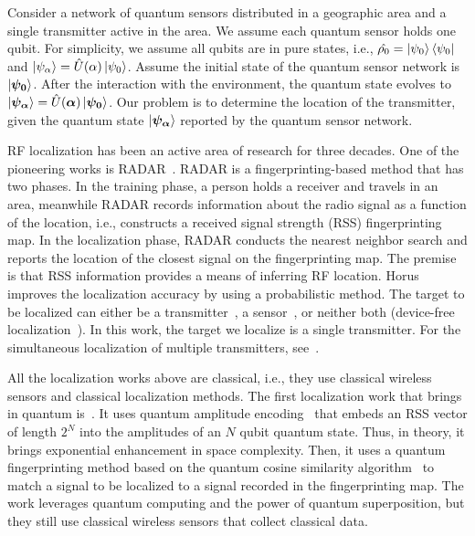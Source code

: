 Consider a network of quantum sensors distributed in a geographic area and a single transmitter active in the area.
We assume each quantum sensor holds one qubit. 
For simplicity, we assume all qubits are in pure states, i.e., $\hat{\rho_0} = \ket{\psi_0} \bra{\psi_0}$ and $\ket{\psi_{\alpha}} = \hat{U}(\alpha) \ket{\psi_0}$.
Assume the initial state of the quantum sensor network is 
$\ket{\boldsymbol{\psi_{0}}}$. 
After the interaction with the environment, the quantum state evolves to $\ket{\boldsymbol{\psi_{\alpha}}} = \hat{U}(\boldsymbol{\alpha}) \ket{\boldsymbol{\psi_{0}}}$.
Our problem is to determine the location of the transmitter, given the quantum state $\ket{\boldsymbol{\psi_{\alpha}}}$ reported by the quantum sensor network.


RF localization has been an active area of research for three decades.
One of the pioneering works is RADAR~\cite{infocom00-radar}.
RADAR is a fingerprinting-based method that has two phases.
In the training phase, a person holds a receiver and travels in an area, meanwhile RADAR records information about the radio signal as a function of the location, i.e., constructs a received signal strength (RSS) fingerprinting map.
In the localization phase, RADAR conducts the nearest neighbor search and reports the location of the closest signal on the fingerprinting map.
The premise is that RSS information provides a means of inferring RF location.
Horus~\cite{mobisys05-horus} improves the localization accuracy by using a probabilistic method.
The target to be localized can either be a transmitter~\cite{tx-localization}, a sensor~\cite{infocom00-radar}, or neither both (device-free localization~\cite{devicefree-loc}).
In this work, the target we localize is a single transmitter.
For the simultaneous localization of multiple transmitters, see~\cite{pmc22-deepmtlpro}.

All the localization works above are classical, i.e., they use classical wireless sensors and classical localization methods.
The first localization work that brings in quantum is~\cite{lcn22-qloc}.
It uses quantum amplitude encoding~\cite{slqc} that embeds an RSS vector of length $2^N$ into the amplitudes of an $N$ qubit quantum state. 
Thus, in theory, it brings exponential enhancement in space complexity.
Then, it uses a quantum fingerprinting method based on the quantum cosine similarity algorithm~\cite{PhysRevLett.quantumfingerprint} to match a signal to be localized to a signal recorded in the fingerprinting map.
The work leverages quantum computing and the power of quantum superposition, but they still use classical wireless sensors that collect classical data.



